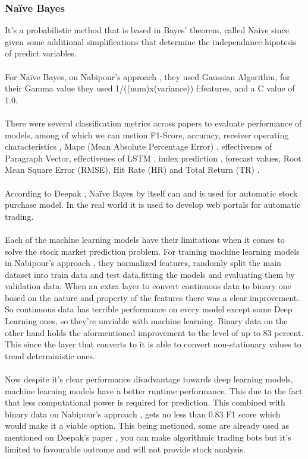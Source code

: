 \documentclass[conference]{IEEEtran}
\begin{document}
\subsubsection{Naïve Bayes}
It's a probabilistic method that is based in Bayes' theorem, called Naive since given some additional simplifications that determine
the independance hipotesis of predict variables.
\\\\
For Naïve Bayes, on Nabipour's approach \cite{nabipour2020predicting}, they used Gaussian Algorithm, for their Gamma value they used 1/((num)x(variance)) f:features, and a C value of 1.0.
\\\\
There were several classification metrics across papers to evaluate performance of models,
among of which we can metion F1-Score, accuracy, receiver operating characteristics \cite{nabipour2020predicting},
Mape (Mean Absolute Percentage Error) \cite{M2018}, effectivenes of Paragraph Vector, effectivenes of LSTM \cite{Akita2016}, index prediction \cite{Vargas2017},
forecast values, Root Mean Square Error (RMSE), Hit Rate (HR) and Total Return (TR) \cite{Singh2016}.
\\\\
According to Deepak \cite{deepak2017machine}, Naïve Bayes by itself can and is used for automatic stock purchase model. In the real world it is used to develop web portals for automatic trading.
\\\\
Each of the machine learning models have their limitations when it comes to solve the stock market prediction problem.
For training machine learning models in Nabipour's approach \cite{nabipour2020predicting}, they normalized features, randomly split 
the main dataset into train data and test data,fitting the models and evaluating them by validation data. When an extra layer to convert continuous data to binary
one based on the nature and property of the features there was a clear improvement. So continuous data has terrible performance on every model except some Deep Learning ones, so they're unviable with machine learning. Binary data on the other hand holds the aformentioned
improvement to the level of up to 83 percent. This since the layer that converts to it is able to convert non-stationary values to trend deterministic ones.
\\\\
Now despite it's clear performance disadvantage towards deep learning models, machine learning models have a better runtime performance. This due to the fact
that less computational power is required for prediction. This combined with binary data on Nabipour's approach \cite{nabipour2020predicting}, gets no less than 0.83 F1 score which would make it
a viable option. This being metioned, some are already used as mentioned on Deepak's paper \cite{deepak2017machine}, you can make algorithmic trading bots but it's limited to favourable outcome and will not provide stock analysis.
\end{document}
